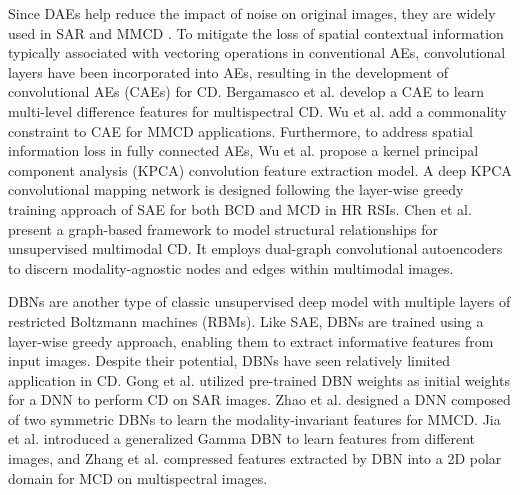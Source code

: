 Since DAEs help reduce the impact of noise on original images, they are widely used in SAR and MMCD \cite{Zhange2016mapping, LiuGQZ18, Zhan2018Iterative, Zhan2018Log}. To mitigate the loss of spatial contextual information typically associated with vectoring operations in conventional AEs, convolutional layers have been incorporated into AEs, resulting in the development of convolutional AEs (CAEs) for CD. Bergamasco et al. \cite{Bergamasco2022Unsupervised} develop a CAE to learn multi-level difference features for multispectral CD. Wu et al. \cite{Wu2022Commonality} add a commonality constraint to CAE for MMCD applications. Furthermore, to address spatial information loss in fully connected AEs, Wu et al. \cite{wu2021unsupervised} propose a kernel principal component analysis (KPCA) convolution feature extraction model. A deep KPCA convolutional mapping network is designed following the layer-wise greedy training approach of SAE for both BCD and MCD in HR RSIs. Chen et al. \cite{Chen2022Unsupervised} present a graph-based framework to model structural relationships for unsupervised multimodal CD. It employs dual-graph convolutional autoencoders to discern modality-agnostic nodes and edges within multimodal images.

\par DBNs are another type of classic unsupervised deep model with multiple layers of restricted Boltzmann machines (RBMs). Like SAE, DBNs are trained using a layer-wise greedy approach, enabling them to extract informative features from input images. Despite their potential, DBNs have seen relatively limited application in CD. Gong et al. \cite{Gong2016Change} utilized pre-trained DBN weights as initial weights for a DNN to perform CD on SAR images. Zhao et al. \cite{Zhao2017Discriminative} designed a DNN composed of two symmetric DBNs to learn the modality-invariant features for MMCD. Jia et al. \cite{JiaChange2021} introduced a generalized Gamma DBN to learn features from different images, and Zhang et al. \cite{Zhang2016Feature} compressed features extracted by DBN into a 2D polar domain for MCD on multispectral images.

